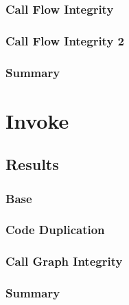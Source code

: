 \subsubsection{Call Flow Integrity}

\subsubsection{Call Flow Integrity 2}

\subsubsection{Summary}



\section{Invoke}

\subsection*{Results}

\subsubsection{Base}

\subsubsection{Code Duplication}

\subsubsection{Call Graph Integrity}

\subsubsection{Summary}



